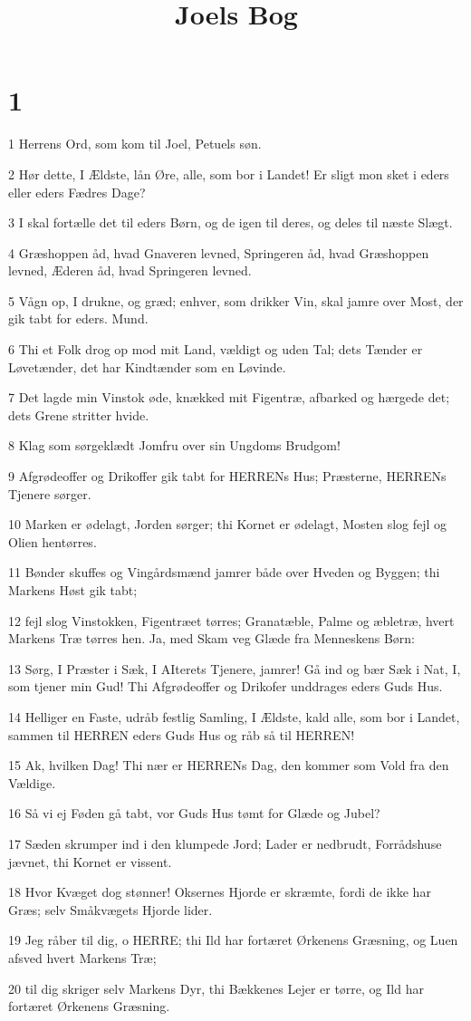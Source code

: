 

\title{Joels Bog}


\chapter{1}

\par 1 Herrens Ord, som kom til Joel, Petuels søn.
\par 2 Hør dette, I Ældste, lån Øre, alle, som bor i Landet! Er sligt mon sket i eders eller eders Fædres Dage?
\par 3 I skal fortælle det til eders Børn, og de igen til deres, og deles til næste Slægt.
\par 4 Græshoppen åd, hvad Gnaveren levned, Springeren åd, hvad Græshoppen levned, Æderen åd, hvad Springeren levned.
\par 5 Vågn op, I drukne, og græd; enhver, som drikker Vin, skal jamre over Most, der gik tabt for eders. Mund.
\par 6 Thi et Folk drog op mod mit Land, vældigt og uden Tal; dets Tænder er Løvetænder, det har Kindtænder som en Løvinde.
\par 7 Det lagde min Vinstok øde, knækked mit Figentræ, afbarked og hærgede det; dets Grene stritter hvide.
\par 8 Klag som sørgeklædt Jomfru over sin Ungdoms Brudgom!
\par 9 Afgrødeoffer og Drikoffer gik tabt for HERRENs Hus; Præsterne, HERRENs Tjenere sørger.
\par 10 Marken er ødelagt, Jorden sørger; thi Kornet er ødelagt, Mosten slog fejl og Olien hentørres.
\par 11 Bønder skuffes og Vingårdsmænd jamrer både over Hveden og Byggen; thi Markens Høst gik tabt;
\par 12 fejl slog Vinstokken, Figentræet tørres; Granatæble, Palme og æbletræ, hvert Markens Træ tørres hen. Ja, med Skam veg Glæde fra Menneskens Børn:
\par 13 Sørg, I Præster i Sæk, I AIterets Tjenere, jamrer! Gå ind og bær Sæk i Nat, I, som tjener min Gud! Thi Afgrødeoffer og Drikofer unddrages eders Guds Hus.
\par 14 Helliger en Faste, udråb festlig Samling, I Ældste, kald alle, som bor i Landet, sammen til HERREN eders Guds Hus og råb så til HERREN!
\par 15 Ak, hvilken Dag! Thi nær er HERRENs Dag, den kommer som Vold fra den Vældige.
\par 16 Så vi ej Føden gå tabt, vor Guds Hus tømt for Glæde og Jubel?
\par 17 Sæden skrumper ind i den klumpede Jord; Lader er nedbrudt, Forrådshuse jævnet, thi Kornet er vissent.
\par 18 Hvor Kvæget dog stønner! Oksernes Hjorde er skræmte, fordi de ikke har Græs; selv Småkvægets Hjorde lider.
\par 19 Jeg råber til dig, o HERRE; thi Ild har fortæret Ørkenens Græsning, og Luen afsved hvert Markens Træ;
\par 20 til dig skriger selv Markens Dyr, thi Bækkenes Lejer er tørre, og Ild har fortæret Ørkenens Græsning.

